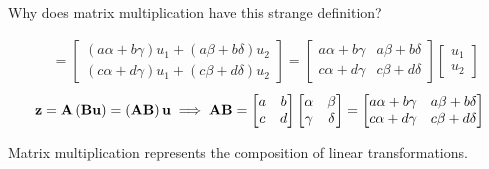 \documentclass[aspectratio=169]{beamer}
\def\mf{\ensuremath\mathbf}
\def\lp{\ensuremath\left(}
\def\rp{\ensuremath\right)}
\begin{document}
\begin{frame}[t]{Why does matrix multiplication have this strange definition?}
\begin{small}
\[\begin{split}
&= \begin{bmatrix}\left(a\alpha + b\gamma\right) u_1 + \left(a\beta + b\delta\right)u_2 \\ \left(c\alpha + d\gamma\right)u_1  + \left(c\beta + d\delta\right)u_2 \end{bmatrix} = \begin{bmatrix}a\alpha + b\gamma & a\beta + b\delta \\ c\alpha + d\gamma & c\beta + d\delta \end{bmatrix} \begin{bmatrix}u_1 \\ u_2 \end{bmatrix}
\end{split}
\]
\[\mf{z} = \mf{A}\lp\mf{B}\mf{u}\rp = \lp\mf{A}\mf{B}\rp\mf{u} \implies \mf{A}\mf{B} = \begin{bmatrix}a & b \\ c & d\end{bmatrix}\begin{bmatrix}\alpha & \beta \\ \gamma & \delta\end{bmatrix} = \begin{bmatrix}a\alpha + b\gamma & a\beta + b\delta \\ c\alpha + d\gamma & c\beta + d\delta \end{bmatrix}
\]
\end{small}
Matrix multiplication represents the composition of linear transformations.
\end{frame}
\end{document}
